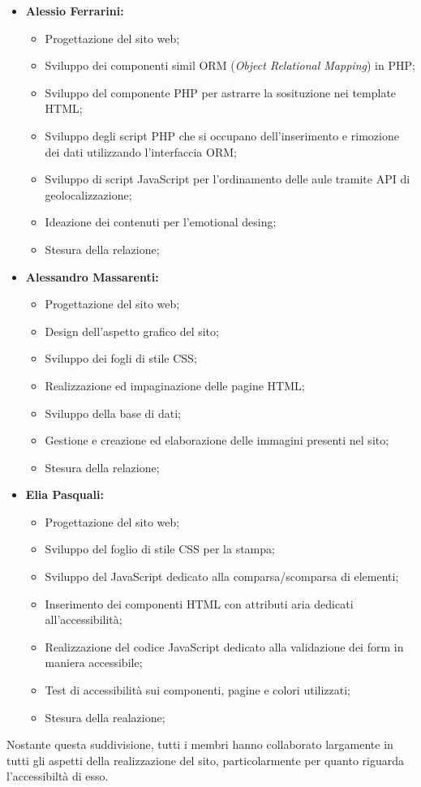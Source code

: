 \begin{itemize}
    \item \textbf{Alessio Ferrarini:}
        \begin{itemize}
            \item Progettazione del sito web;
            \item Sviluppo dei componenti simil ORM (\textit{Object Relational Mapping}) in PHP;
            \item Sviluppo del componente PHP per astrarre la sosituzione nei template HTML;
            \item Sviluppo degli script PHP che si occupano dell'inserimento e rimozione dei dati utilizzando l'interfaccia ORM;
            \item Sviluppo di script JavaScript per l'ordinamento delle aule tramite API di geolocalizzazione;
            \item Ideazione dei contenuti per l'emotional desing;
            \item Stesura della relazione;
        \end{itemize}
    \item \textbf{Alessandro Massarenti:}
        \begin{itemize}
            \item Progettazione del sito web;
            \item Design dell'aspetto grafico del sito;
            \item Sviluppo dei fogli di stile CSS;
            \item Realizzazione ed impaginazione delle pagine HTML;
            \item Sviluppo della base di dati;
            \item Gestione e creazione ed elaborazione delle immagini presenti nel sito;
            \item Stesura della relazione;
        \end{itemize}
    \item \textbf{Elia Pasquali:}
        \begin{itemize}
            \item Progettazione del sito web;
            \item Sviluppo del foglio di stile CSS per la stampa; 
            \item Sviluppo del JavaScript dedicato alla comparsa/scomparsa di elementi;
            \item Inserimento dei componenti HTML con attributi aria dedicati all'accessibilità;
            \item Realizzazione del codice JavaScript dedicato alla validazione dei form in maniera accessibile;
            \item Test di accessibilità sui componenti, pagine e colori utilizzati;
            \item Stesura della realazione;
        \end{itemize}
\end{itemize}

Nostante questa suddivisione, tutti i membri hanno collaborato largamente in tutti gli aspetti della realizzazione del sito, particolarmente per quanto riguarda l'accessibiltà di esso.